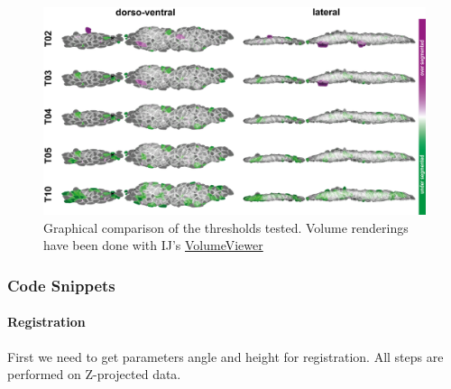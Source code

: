 \documentclass[11pt,singlespacinge,twoside]{reedthesis} %
\theoremstyle{definition}
\theoremstyle{definition}
\theoremstyle{definition}
\theoremstyle{remark}
\begin{document}
\begin{figure}

{\centering \includegraphics[width=0.85\linewidth]{figures/materials/ground_truth/volumes} 

}

\caption[anaLLzr3D - Graphical comparison of tested thresholds]{Graphical comparison of the thresholds tested. Volume renderings have been done with IJ's \href{\%22https://github.com/fiji/Volume_Viewer/releases/tag/Volume_Viewer-2.01.2\%22}{VolumeViewer}}\label{fig:anallzrvols}
\end{figure}
\noindent 

\hypertarget{code-snippets-1}{%
\subsubsection{Code Snippets}\label{code-snippets-1}}

\hypertarget{registration-2}{%
\paragraph{Registration}\label{registration-2}}

First we need to get parameters angle and height for registration. All steps are performed on Z-projected data.
\end{document}

